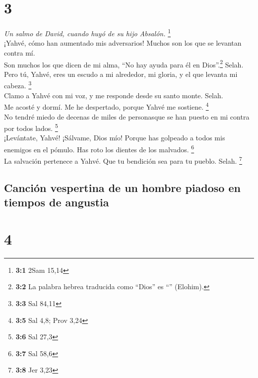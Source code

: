 \hypertarget{section-2}{%
\section{3}\label{section-2}}

\emph{Un salmo de David, cuando huyó de su hijo Absalón.} \footnote{\textbf{3:1}
  2Sam 15,14}\\
 ¡Yahvé, cómo han aumentado mis adversarios! Muchos son
los que se levantan contra mí.\\
 Son muchos los que dicen de mi alma, ``No hay ayuda para
él en Dios''.\footnote{\textbf{3:2} La palabra hebrea traducida como
  ``Dios'' es ``'' (Elohim).} Selah.\\
 Pero tú, Yahvé, eres un escudo a mi alrededor, mi gloria,
y el que levanta mi cabeza. \footnote{\textbf{3:3} Sal 84,11}\\
 Clamo a Yahvé con mi voz, y me responde desde su santo
monte. Selah.\\
 Me acosté y dormí. Me he despertado, porque Yahvé me
sostiene. \footnote{\textbf{3:5} Sal 4,8; Prov 3,24}\\
 No tendré miedo de decenas de miles de personasque se han
puesto en mi contra por todos lados. \footnote{\textbf{3:6} Sal 27,3}\\
 ¡Levántate, Yahvé! ¡Sálvame, Dios mío! Porque has
golpeado a todos mis enemigos en el pómulo. Has roto los dientes de los
malvados. \footnote{\textbf{3:7} Sal 58,6}\\
 La salvación pertenece a Yahvé. Que tu bendición sea para
tu pueblo. Selah. \footnote{\textbf{3:8} Jer 3,23}

\hypertarget{canciuxf3n-vespertina-de-un-hombre-piadoso-en-tiempos-de-angustia}{%
\subsection{Canción vespertina de un hombre piadoso en tiempos de
angustia}\label{canciuxf3n-vespertina-de-un-hombre-piadoso-en-tiempos-de-angustia}}

\hypertarget{section-3}{%
\section{4}\label{section-3}}

